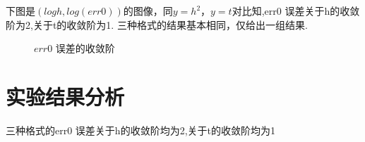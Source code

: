 \documentclass{article}
\begin{document}
下图是$(logh,log(err0))$的图像，同$y=h^2$，$y=t $对比知,err0 误差关于h的收敛阶为2,关于t的收敛阶为1.
三种格式的结果基本相同，仅给出一组结果.
\begin{figure}[H]
	\caption{\label{err0} $err0$ 误差的收敛阶}
\end{figure}



\section{实验结果分析}
三种格式的err0 误差关于h的收敛阶均为2,关于t的收敛阶均为1
\end{document}
